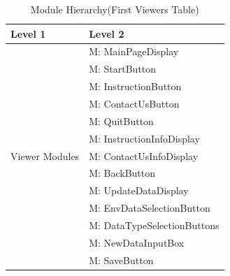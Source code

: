 \documentclass[12pt, titlepage]{article}
\newcounter{mnum}
\newcommand{\mthemnum}{M\themnum}
\begin{document}
\begin{table}[H]
\caption{Module Hierarchy(First Viewers Table)}
\label{TblViewers1}

\centering
\begin{tabular}{p{} p{}}
\toprule
\textbf{Level 1} & \textbf{Level 2}\\
\midrule

\multirow{13}{0.3\textwidth}{Viewer Modules}
& {mnum} \mthemnum \label{Viwer1}: MainPageDisplay \\
& {mnum} \mthemnum \label{Viwer2}: StartButton \\
& {mnum} \mthemnum \label{Viwer3}: InstructionButton \\
& {mnum} \mthemnum \label{Viwer4}: ContactUsButton \\
& {mnum} \mthemnum \label{Viwer5}: QuitButton \\
& {mnum} \mthemnum \label{Viwer6}: InstructionInfoDisplay \\
& {mnum} \mthemnum \label{Viwer7}: ContactUsInfoDisplay \\ 
& {mnum} \mthemnum \label{Viwer8}: BackButton \\
& {mnum} \mthemnum \label{Viwer9}: UpdateDataDisplay \\
& {mnum} \mthemnum \label{Viwer10}: EnvDataSelectionButton \\
& {mnum} \mthemnum \label{Viwer11}: DataTypeSelectionButtons \\
& {mnum} \mthemnum \label{Viwer12}: NewDataInputBox \\
& {mnum} \mthemnum \label{Viwer13}: SaveButton \\

\bottomrule
\end{tabular}
\end{table}

\newpage
\end{document}
